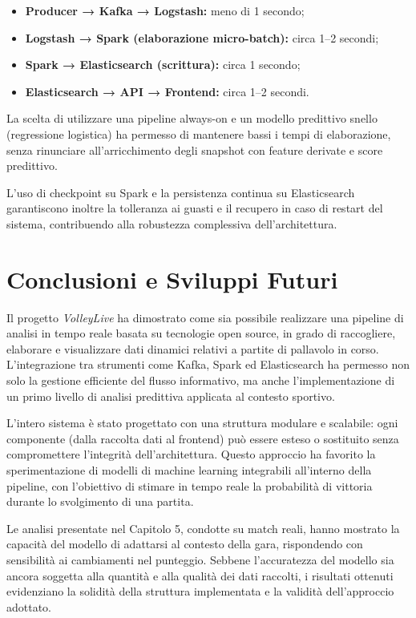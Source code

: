 \documentclass[a4paper,12pt]{report}
\begin{document}
\begin{itemize}
  \item \textbf{Producer → Kafka → Logstash:} meno di 1 secondo;
  \item \textbf{Logstash → Spark (elaborazione micro-batch):} circa 1--2 secondi;
  \item \textbf{Spark → Elasticsearch (scrittura):} circa 1 secondo;
  \item \textbf{Elasticsearch → API → Frontend:} circa 1--2 secondi.
\end{itemize}

La scelta di utilizzare una pipeline always-on e un modello predittivo snello (regressione logistica) ha permesso di mantenere bassi i tempi di elaborazione, senza rinunciare all’arricchimento degli snapshot con feature derivate e score predittivo.

L’uso di checkpoint su Spark e la persistenza continua su Elasticsearch garantiscono inoltre la tolleranza ai guasti e il recupero in caso di restart del sistema, contribuendo alla robustezza complessiva dell’architettura.



\chapter*{Conclusioni e Sviluppi Futuri}

Il progetto \textit{VolleyLive} ha dimostrato come sia possibile realizzare una pipeline di analisi in tempo reale basata su tecnologie open source, in grado di raccogliere, elaborare e visualizzare dati dinamici relativi a partite di pallavolo in corso. L’integrazione tra strumenti come Kafka, Spark ed Elasticsearch ha permesso non solo la gestione efficiente del flusso informativo, ma anche l’implementazione di un primo livello di analisi predittiva applicata al contesto sportivo.

L’intero sistema è stato progettato con una struttura modulare e scalabile: ogni componente (dalla raccolta dati al frontend) può essere esteso o sostituito senza compromettere l’integrità dell’architettura. Questo approccio ha favorito la sperimentazione di modelli di machine learning integrabili all’interno della pipeline, con l’obiettivo di stimare in tempo reale la probabilità di vittoria durante lo svolgimento di una partita.

Le analisi presentate nel Capitolo 5, condotte su match reali, hanno mostrato la capacità del modello di adattarsi al contesto della gara, rispondendo con sensibilità ai cambiamenti nel punteggio. Sebbene l’accuratezza del modello sia ancora soggetta alla quantità e alla qualità dei dati raccolti, i risultati ottenuti evidenziano la solidità della struttura implementata e la validità dell’approccio adottato.
\end{document}
